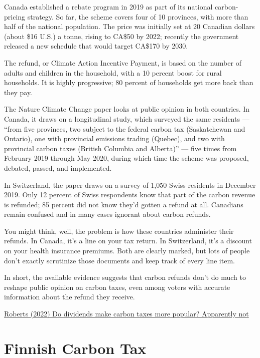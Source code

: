 \documentclass[
]{book}
\begin{document}
Canada established a rebate program in 2019 as part of its national carbon-pricing strategy. So far, the scheme covers four of 10 provinces, with more than half of the national population. The price was initially set at 20 Canadian dollars (about \$16 U.S.) a tonne, rising to CA\$50 by 2022; recently the government released a new schedule that would target CA\$170 by 2030.

The refund, or Climate Action Incentive Payment, is based on the number of adults and children in the household, with a 10 percent boost for rural households. It is highly progressive; 80 percent of households get more back than they pay.

The Nature Climate Change paper looks at public opinion in both countries. In Canada, it draws on a longitudinal study, which surveyed the same residents --- ``from five provinces, two subject to the federal carbon tax (Saskatchewan and Ontario), one with provincial emissions trading (Quebec), and two with provincial carbon taxes (British Columbia and Alberta)'' --- five times from February 2019 through May 2020, during which time the scheme was proposed, debated, passed, and implemented.

In Switzerland, the paper draws on a survey of 1,050 Swiss residents in December 2019.
Only 12 percent of Swiss respondents know that part of the carbon revenue is refunded; 85 percent did not know they'd gotten a refund at all.
Canadians remain confused and in many cases ignorant about carbon refunds.

You might think, well, the problem is how these countries administer their refunds. In Canada, it's a line on your tax return. In Switzerland, it's a discount on your health insurance premiums. Both are clearly marked, but lots of people don't exactly scrutinize those documents and keep track of every line item.

In short, the available evidence suggests that carbon refunds don't do much to reshape public opinion on carbon taxes, even among voters with accurate information about the refund they receive.

\href{https://www.volts.wtf/p/do-dividends-make-carbon-taxes-more}{Roberts (2022) Do dividends make carbon taxes more popular? Apparently not}

\hypertarget{finnish-carbon-tax}{%
\section{Finnish Carbon Tax}\label{finnish-carbon-tax}}
\end{document}

